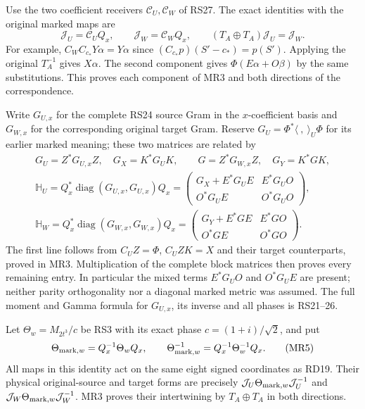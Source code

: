 Use the two coefficient receivers $\mathcal C_U,\mathcal C_W$
of RS27. The exact identities with the original marked maps are
\begin{equation}
 \mathcal J_U=\mathcal C_UQ_x,\qquad
 \mathcal J_W=\mathcal C_WQ_x,\qquad
 (T_A\oplus T_A)\mathcal J_U=\mathcal J_W.
 \tag{MR3}
\end{equation}
For example, $C_WC_{c_*}Y\alpha=Y\alpha$ since
$(C_{c_*}p)(S'-c_*)=p(S')$. Applying the original $T_A^{-1}$
gives $X\alpha$. The second component gives
$\Phi(E\alpha+O\beta)$ by the same substitutions. This proves
each component of MR3 and both directions of the correspondence.

Write $G_{U,x}$ for the complete RS24 source Gram in the
$x$-coefficient basis and $G_{W,x}$ for the corresponding
original target Gram. Reserve $G_U=\Phi^*\langle\ ,\ \rangle_U\Phi$
for its earlier marked meaning; these two matrices are related by
\begin{equation}
 \begin{gathered}
 G_U=Z^*G_{U,x}Z,\quad G_X=K^*G_UK,\qquad
 G=Z^*G_{W,x}Z,\quad G_Y=K^*GK,\\
 \mathbb H_U=Q_x^*\operatorname{diag}(G_{U,x},G_{U,x})Q_x
 =\begin{pmatrix}
 G_X+E^*G_UE&E^*G_UO\\O^*G_UE&O^*G_UO
 \end{pmatrix},\\
 \mathbb H_W=Q_x^*\operatorname{diag}(G_{W,x},G_{W,x})Q_x
 =\begin{pmatrix}
 G_Y+E^*GE&E^*GO\\O^*GE&O^*GO
 \end{pmatrix}.
 \end{gathered}\tag{MR4}
\end{equation}
The first line follows from $C_UZ=\Phi$, $C_UZK=X$ and
their target counterparts, proved in MR3. Multiplication
of the complete block matrices then proves every remaining
entry. In particular the mixed terms $E^*G_UO$ and $O^*G_UE$
are present; neither parity orthogonality nor a diagonal
marked metric was assumed. The full moment and Gamma formula
for $G_{U,x}$, its inverse and all phases is RS21--26.

Let $\Theta_w=M_{2t^3}/c$ be RS3 with its exact phase
$c=(1+i)/\sqrt2$, and put
\begin{equation}
 \Theta_{{\rm mark},w}=Q_x^{-1}\Theta_wQ_x,\qquad
 \Theta_{{\rm mark},w}^{-1}=Q_x^{-1}\Theta_w^{-1}Q_x.
 \tag{MR5}
\end{equation}
All maps in this identity act on the same eight signed
coordinates as RD19. Their physical original-source and
target forms are precisely $\mathcal J_U\Theta_{{\rm mark},w}
\mathcal J_U^{-1}$ and $\mathcal J_W\Theta_{{\rm mark},w}
\mathcal J_W^{-1}$. MR3 proves their intertwining by
$T_A\oplus T_A$ in both directions.

